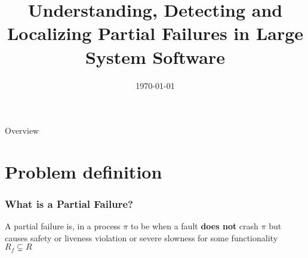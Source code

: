 \documentclass[aspectratio=169]{beamer}
\title{Understanding, Detecting and Localizing Partial Failures in Large System Software\footfullcite{lou2020understanding}}
\date{\today}
\begin{document}
\begin{frame}
	\titlepage
\end{frame}

\begin{frame}{Overview}
    \tableofcontents
  \end{frame}

\section{Problem definition}

\begin{frame}
    \frametitle{What is a Partial Failure?}
    \begin{definition}
        A partial failure is, in a process $\pi$ to be when a fault \textbf{does not} crash $\pi$ but causes safety or liveness violation or severe slowness for some functionality $R_f \subsetneq  R$

    \end{definition}
\end{frame}
    
\end{document}
